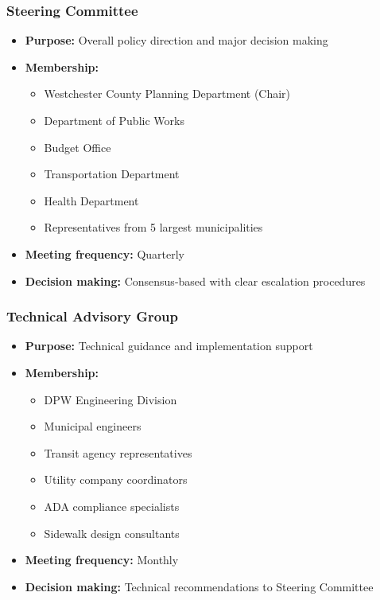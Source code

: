 \documentclass[11pt,letterpaper]{article}
\begin{document}
\subsubsection{Steering Committee}
\begin{itemize}
    \item \textbf{Purpose:} Overall policy direction and major decision making
    \item \textbf{Membership:}
        \begin{itemize}
            \item Westchester County Planning Department (Chair)
            \item Department of Public Works
            \item Budget Office
            \item Transportation Department
            \item Health Department
            \item Representatives from 5 largest municipalities
        \end{itemize}
    \item \textbf{Meeting frequency:} Quarterly
    \item \textbf{Decision making:} Consensus-based with clear escalation procedures
\end{itemize}

\subsubsection{Technical Advisory Group}
\begin{itemize}
    \item \textbf{Purpose:} Technical guidance and implementation support
    \item \textbf{Membership:}
        \begin{itemize}
            \item DPW Engineering Division
            \item Municipal engineers
            \item Transit agency representatives
            \item Utility company coordinators
            \item ADA compliance specialists
            \item Sidewalk design consultants
        \end{itemize}
    \item \textbf{Meeting frequency:} Monthly
    \item \textbf{Decision making:} Technical recommendations to Steering Committee
\end{itemize}
\end{document}
